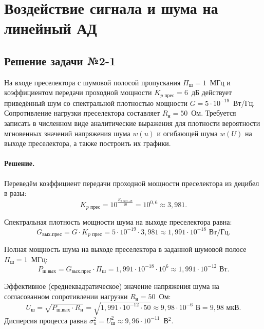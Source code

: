 \section{Воздействие сигнала и шума на линейный АД}

\subsection{Решение задачи №2-1}

На входе преселектора с шумовой полосой пропускания $\Pi_{\text{ш}} = 1$~МГц и коэффициентом передачи проходной мощности $K_{p\text{ прес}} = 6$~дБ действует приведённый шум со спектральной плотностью мощности $G = 5 \cdot 10^{-19}$~Вт/Гц. Сопротивление нагрузки преселектора составляет $R_{\text{н}} = 50$~Ом.
Требуется записать в численном виде аналитические выражения для плотности вероятности мгновенных значений напряжения шума $w(u)$ и огибающей шума $w(U)$ на выходе преселектора, а также построить их графики.

\paragraph{Решение.}
Переведём коэффициент передачи проходной мощности преселектора из децибел в разы:
\begin{equation}
    K_{p\text{ прес}} = 10^{\frac{K_{p\text{ прес, дБ}}}{10}} = 10^{0{,}6} \approx 3{,}981.
\end{equation}

Спектральная плотность мощности шума на выходе преселектора равна:
\begin{equation}
    G_{\text{вых.прес}} = G \cdot K_{p\text{ прес}} = 5 \cdot 10^{-19} \cdot 3{,}981 \approx 1{,}991 \cdot 10^{-18}\text{ Вт/Гц}.
\end{equation}

Полная мощность шума на выходе преселектора в заданной шумовой полосе $\Pi_{\text{ш}} = 1$~МГц:
\begin{equation}
    P_{\text{ш.вых}} = G_{\text{вых.прес}} \cdot \Pi_{\text{ш}} = 1{,}991 \cdot 10^{-18} \cdot 10^6 \approx 1{,}991 \cdot 10^{-12}\text{ Вт}.
\end{equation}

Эффективное (среднеквадратическое) значение напряжения шума на согласованном сопротивлении нагрузки $R_{\text{н}} = 50$~Ом:
\begin{equation}
    U_{\text{ш}} = \sqrt{P_{\text{ш.вых}} \cdot R_{\text{н}}} = \sqrt{1{,}991 \cdot 10^{-12} \cdot 50} \approx 9{,}98 \cdot 10^{-6}\text{ В} = 9{,}98\text{ мкВ}.
\end{equation}
Дисперсия процесса равна $\sigma_u^2 = U_{\text{ш}}^2 \approx 9{,}96 \cdot 10^{-11}$~В$^2$.

